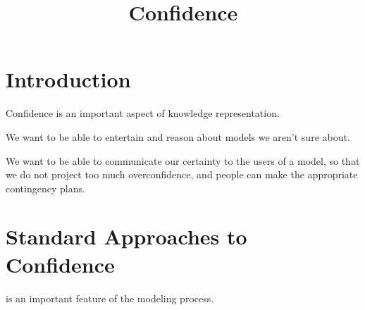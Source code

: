 \documentclass{article}
\title{Confidence}
\begin{document}
\maketitle    

\section{Introduction}
Confidence is an important aspect of knowledge representation.

We want to be able to entertain and reason about models we aren't sure about.

We want to be able to communicate our certainty to the users of a model, so that
we do not project too much overconfidence, and people can make the appropriate
contingency plans. 


\section{Standard Approaches to Confidence}

 is an important feature of the modeling process.



\section{}
\end{document}
